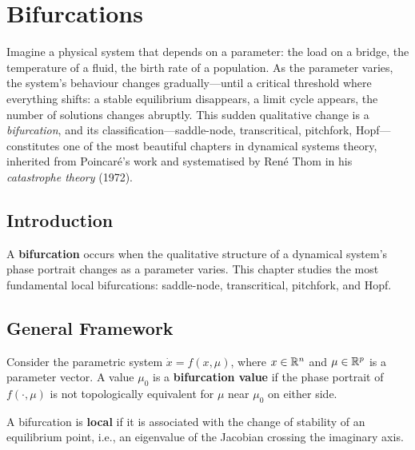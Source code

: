 \chapter{Bifurcations}
\label{ch:bifurcations}

Imagine a physical system that depends on a parameter: the load on a bridge, the temperature of a fluid, the birth rate of a population. As the parameter varies, the system's behaviour changes gradually---until a critical threshold where everything shifts: a stable equilibrium disappears, a limit cycle appears, the number of solutions changes abruptly. This sudden qualitative change is a \emph{bifurcation}, and its classification---saddle-node, transcritical, pitchfork, Hopf---constitutes one of the most beautiful chapters in dynamical systems theory, inherited from Poincar\'e's work and systematised by Ren\'e Thom in his \emph{catastrophe theory} (1972).

\section{Introduction}

A \textbf{bifurcation} occurs when the qualitative structure of a dynamical
system's phase portrait changes as a parameter varies. This chapter studies
the most fundamental local bifurcations: saddle-node, transcritical,
pitchfork, and Hopf.

\section{General Framework}

\begin{definition}[Bifurcation]
Consider the parametric system $\dot{x} = f(x, \mu)$, where $x \in \mathbb{R}^n$
and $\mu \in \mathbb{R}^p$ is a parameter vector. A value $\mu_0$ is a
\textbf{bifurcation value} if the phase portrait of $f(\cdot, \mu)$ is not
topologically equivalent for $\mu$ near $\mu_0$ on either side.
\end{definition}

\begin{definition}
A bifurcation is \textbf{local} if it is associated with the change of
stability of an equilibrium point, i.e., an eigenvalue of the Jacobian
crossing the imaginary axis.
\end{definition}

